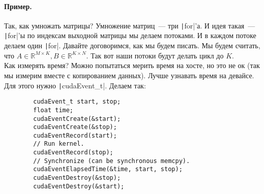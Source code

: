 \documentclass{article}
\begin{document}
    \paragraph{Пример.}
    Так, как умножать матрицы? Умножение матриц~--- три \texttt|for|'а. И идея такая~--- \texttt|for|'ы по индексам выходной матрицы мы делаем потоками. И в каждом потоке делаем один \texttt|for|. Давайте договоримся, как мы будем писать. Мы будем считать, что $A\in\mathbb R^{M\times K},B\in\mathbb R^{K\times N}$. Так вот наши потоки будут делать цикл до $K$.\\
    Как измерять время? Можно попытаться мерить время на хосте, но это не ок (так мы измерим вместе с копированием данных). Лучше узнавать время на девайсе. Для этого нужно \texttt|cudaEvent_t|. Делаем так:
    \begin{verbatim}
        cudaEvent_t start, stop;
        float time;
        cudaEventCreate(&start);
        cudaEventCreate(&stop);
        cudaEventRecord(start);
        // Run kernel.
        cudaEventRecord(stop);
        // Synchronize (can be synchronous memcpy).
        cudaEventElapsedTime(&time, start, stop);
        cudaEventDestroy(&stop);
        cudaEventDestroy(&start);
    \end{verbatim}
\end{document}
